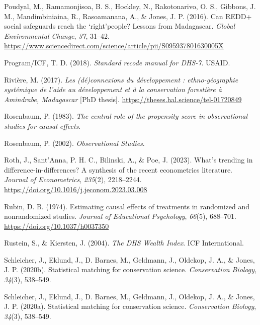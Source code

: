\documentclass[
]{article}
\newlength{\cslhangindent}
\newenvironment{CSLReferences}[2] %
 {\begin{list}{}{%
  \setlength{\itemindent}{0pt}
  \setlength{\leftmargin}{0pt}
  \setlength{\parsep}{0pt}
  \ifodd #1
   \setlength{\leftmargin}{\cslhangindent}
   \setlength{\itemindent}{-1\cslhangindent}
  \fi
  \setlength{\itemsep}{#2\baselineskip}}}
 {\end{list}}
\begin{document}
\begin{CSLReferences}{1}{0}
Poudyal, M., Ramamonjisoa, B. S., Hockley, N., Rakotonarivo, O. S.,
Gibbons, J. M., Mandimbiniaina, R., Rasoamanana, A., \& Jones, J. P.
(2016). Can {REDD}+ social safeguards reach the `right'people? {Lessons}
from {Madagascar}. \emph{Global Environmental Change}, \emph{37},
31--42.
\url{https://www.sciencedirect.com/science/article/pii/S095937801630005X}

Program/ICF, T. D. (2018). \emph{Standard recode manual for {DHS}-7}.
USAID.

Rivière, M. (2017). \emph{Les (dé)connexions du développement :
ethno-géographie systémique de l'aide au développement et à la
conservation forestière à Amindrabe, Madagascar} {[}PhD thesis{]}.
\url{https://theses.hal.science/tel-01720849}

Rosenbaum, P. (1983). \emph{The central role of the propensity score in
observational studies for causal effects}.

Rosenbaum, P. (2002). \emph{Observational {Studies}}.

Roth, J., Sant'Anna, P. H. C., Bilinski, A., \& Poe, J. (2023). What's
trending in difference-in-differences? {A} synthesis of the recent
econometrics literature. \emph{Journal of Econometrics}, \emph{235}(2),
2218--2244. \url{https://doi.org/10.1016/j.jeconom.2023.03.008}

Rubin, D. B. (1974). Estimating causal effects of treatments in
randomized and nonrandomized studies. \emph{Journal of Educational
Psychology}, \emph{66}(5), 688--701.
\url{https://doi.org/10.1037/h0037350}

Rustein, S., \& Kiersten, J. (2004). \emph{The {DHS} {Wealth} {Index}}.
ICF International.

Schleicher, J., Eklund, J., D. Barnes, M., Geldmann, J., Oldekop, J. A.,
\& Jones, J. P. (2020b). Statistical matching for conservation science.
\emph{Conservation Biology}, \emph{34}(3), 538--549.

Schleicher, J., Eklund, J., D. Barnes, M., Geldmann, J., Oldekop, J. A.,
\& Jones, J. P. (2020a). Statistical matching for conservation science.
\emph{Conservation Biology}, \emph{34}(3), 538--549.


\end{CSLReferences}
\end{document}
